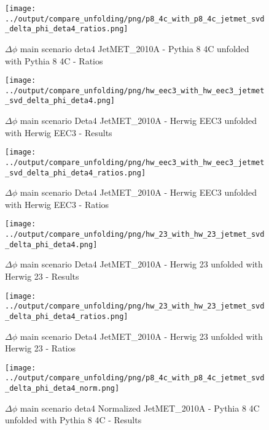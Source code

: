 \documentclass[11pt]{book}
\begin{document}
\begin{figure}[ht]
\centering
\texttt{[image: ../output/compare\_unfolding/png/p8\_4c\_with\_p8\_4c\_jetmet\_svd\_delta\_phi\_deta4\_ratios.png]}
\caption{$\Delta\phi$ main scenario deta4 JetMET\_2010A - Pythia 8 4C unfolded with Pythia 8 4C - Ratios}
\label{p8_p8_jetmet_svd_delta_phi_deta4_b}
\end{figure}

\begin{figure}[ht]
\centering
\texttt{[image: ../output/compare\_unfolding/png/hw\_eec3\_with\_hw\_eec3\_jetmet\_svd\_delta\_phi\_deta4.png]}
\caption{$\Delta\phi$ main scenario Deta4 JetMET\_2010A - Herwig EEC3 unfolded with Herwig EEC3 - Results}
\label{hw_eec3_hw_eec3_jetmet_svd_delta_phi_deta4_a}
\end{figure}

\begin{figure}[ht]
\centering
\texttt{[image: ../output/compare\_unfolding/png/hw\_eec3\_with\_hw\_eec3\_jetmet\_svd\_delta\_phi\_deta4\_ratios.png]}
\caption{$\Delta\phi$ main scenario Deta4 JetMET\_2010A - Herwig EEC3 unfolded with Herwig EEC3 - Ratios}
\label{hw_eec3_hw_eec3_jetmet_svd_delta_phi_deta4_b}
\end{figure}

\begin{figure}[ht]
\centering
\texttt{[image: ../output/compare\_unfolding/png/hw\_23\_with\_hw\_23\_jetmet\_svd\_delta\_phi\_deta4.png]}
\caption{$\Delta\phi$ main scenario Deta4 JetMET\_2010A - Herwig 23 unfolded with Herwig 23 - Results}
\label{hw_23_hw_23_jetmet_svd_delta_phi_deta4_a}
\end{figure}

\begin{figure}[ht]
\centering
\texttt{[image: ../output/compare\_unfolding/png/hw\_23\_with\_hw\_23\_jetmet\_svd\_delta\_phi\_deta4\_ratios.png]}
\caption{$\Delta\phi$ main scenario Deta4 JetMET\_2010A - Herwig 23 unfolded with Herwig 23 - Ratios}
\label{hw_23_hw_23_jetmet_svd_delta_phi_deta4_b}
\end{figure}


\begin{figure}[ht]
\centering
\texttt{[image: ../output/compare\_unfolding/png/p8\_4c\_with\_p8\_4c\_jetmet\_svd\_delta\_phi\_deta4\_norm.png]}
\caption{$\Delta\phi$ main scenario deta4 Normalized JetMET\_2010A - Pythia 8 4C unfolded with Pythia 8 4C - Results}
\label{p8_p8_jetmet_svd_delta_phi_deta4_norm_a}
\end{figure}
\end{document}
